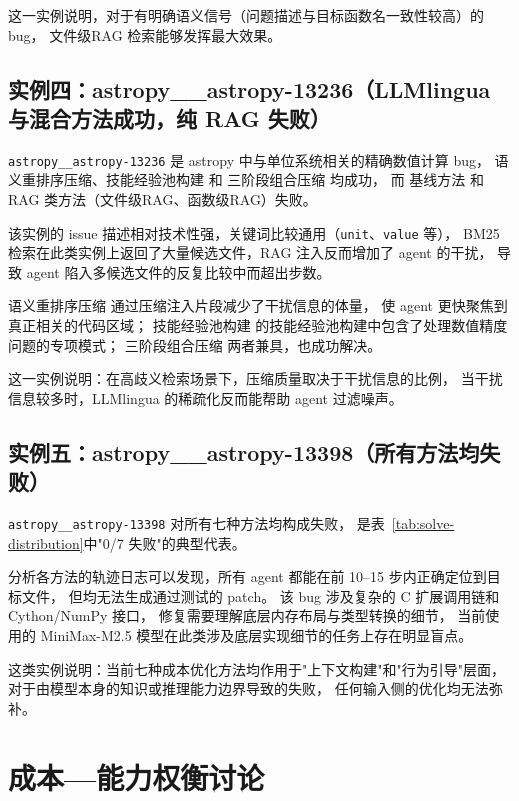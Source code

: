 这一实例说明，对于有明确语义信号（问题描述与目标函数名一致性较高）的 bug，
文件级RAG 检索能够发挥最大效果。

\subsection{实例四：astropy\_\_astropy-13236（LLMlingua 与混合方法成功，纯 RAG 失败）}
\label{subsec:case-astropy-13236}

\texttt{astropy\_\_astropy-13236} 是 astropy 中与单位系统相关的精确数值计算 bug，
语义重排序压缩、技能经验池构建 和 三阶段组合压缩 均成功，
而 基线方法 和 RAG 类方法（文件级RAG、函数级RAG）失败。

该实例的 issue 描述相对技术性强，关键词比较通用（\texttt{unit}、\texttt{value} 等），
BM25 检索在此类实例上返回了大量候选文件，RAG 注入反而增加了 agent 的干扰，
导致 agent 陷入多候选文件的反复比较中而超出步数。

语义重排序压缩 通过压缩注入片段减少了干扰信息的体量，
使 agent 更快聚焦到真正相关的代码区域；
技能经验池构建 的技能经验池构建中包含了处理数值精度问题的专项模式；
三阶段组合压缩 两者兼具，也成功解决。

这一实例说明：在高歧义检索场景下，压缩质量取决于干扰信息的比例，
当干扰信息较多时，LLMlingua 的稀疏化反而能帮助 agent 过滤噪声。

\subsection{实例五：astropy\_\_astropy-13398（所有方法均失败）}
\label{subsec:case-astropy-13398}

\texttt{astropy\_\_astropy-13398} 对所有七种方法均构成失败，
是表~\ref{tab:solve-distribution}中"0/7 失败"的典型代表。

分析各方法的轨迹日志可以发现，所有 agent 都能在前 10–15 步内正确定位到目标文件，
但均无法生成通过测试的 patch。
该 bug 涉及复杂的 C 扩展调用链和 Cython/NumPy 接口，
修复需要理解底层内存布局与类型转换的细节，
当前使用的 MiniMax-M2.5 模型在此类涉及底层实现细节的任务上存在明显盲点。

这类实例说明：当前七种成本优化方法均作用于"上下文构建"和"行为引导"层面，
对于由模型本身的知识或推理能力边界导致的失败，
任何输入侧的优化均无法弥补。


\section{成本—能力权衡讨论}
\label{sec:tradeoff-discussion}

